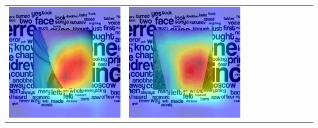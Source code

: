 \begin{landscape}
\begin{table}[]
\begin{tabular}{@{}c c c c c c c c c c@{}}
			\includegraphics[width=.12\textheight ,keepaspectratio]{images/pretraining/gradcam/3/ResNet50V2CombinedGradCam.png} &
			\includegraphics[width=.12\textheight ,keepaspectratio]{images/pretraining/gradcam/9/ResNet50V2CombinedGradCam.png}
			\\\cmidrule(lr){1-10}
			

\end{tabular}
\end{table}
\end{landscape}
